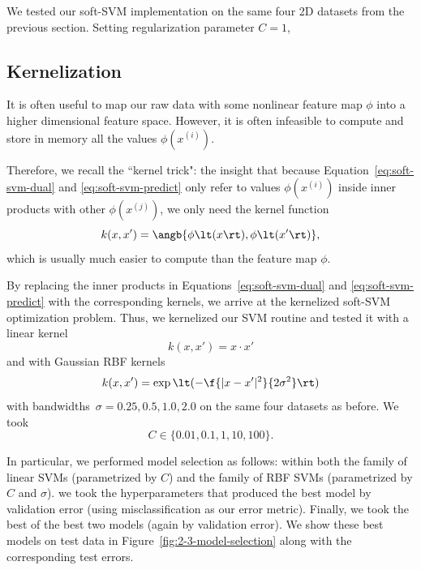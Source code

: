 \documentclass{article}
\newcommand{\sind}[1]{^{(#1)}}
\begin{document}
\begin{multicols}{2}
We tested our soft-SVM implementation
on the same four 2D datasets from the previous section.
Setting regularization parameter $C=1$,




\subsection{Kernelization}

It is often useful to map our raw data
with some nonlinear feature map $\phi$
into a higher dimensional feature space.
However, it is often infeasible to compute and store in memory
all the values $\phi(x\sind{i})$.

Therefore, we recall the ``kernel trick": the insight that
because Equation~\ref{eq:soft-svm-dual} and \ref{eq:soft-svm-predict}
only refer to values $\phi(x\sind{i})$ inside inner products
with other $\phi(x\sind{j})$,
we only need the kernel function
\begin{equation}
    k(x, x') = \angb{\phi\lt(x\rt), \phi\lt(x'\rt)},
\end{equation}
which is usually much easier to compute than the feature map $\phi$.

By replacing the inner products in
Equations~\ref{eq:soft-svm-dual} and \ref{eq:soft-svm-predict}
with the corresponding kernels,
we arrive at the kernelized soft-SVM optimization problem.
Thus, we kernelized our SVM routine
and tested it with a linear kernel
\begin{equation}
    k(x, x') = x\cdot x'
\end{equation}
and with Gaussian RBF kernels
\begin{equation}
    k(x, x') = \exp\lt(-\f{|x - x'|^2}{2\sigma^2}\rt)
\end{equation}
with bandwidths~$\sigma=0.25,0.5,1.0,2.0$ on the same four datasets as before.
We took
\[
    C \in \{0.01, 0.1, 1, 10, 100\}.
\]

In particular, we performed model selection as follows:
within both the family of linear SVMs (parametrized by $C$)
and the family of RBF SVMs (parametrized by $C$ and $\sigma$).
we took the hyperparameters that produced the best model by validation error
(using misclassification as our error metric).
Finally, we took the best of the best two models (again by validation error).
We show these best models on test data in Figure~\ref{fig:2-3-model-selection}
along with the corresponding test errors.


\end{multicols}
\end{document}
